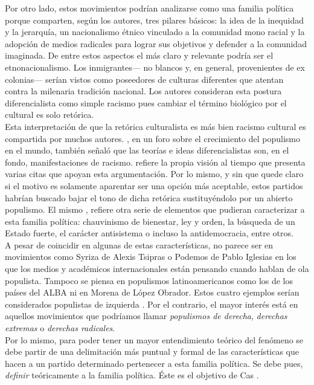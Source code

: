 Por otro lado, estos movimientos podrían analizarse como una familia política porque comparten, según los autores, tres pilares básicos: la idea de la inequidad y la jerarquía, un nacionalismo étnico vinculado a la comunidad mono racial y la adopción de medios radicales para lograr sus objetivos y defender a la comunidad imaginada. De entre estos aspectos el más claro y relevante podría ser el etnonacionalismo. Los inmigrantes--- no blancos y, en general, provenientes de ex colonias--- serían vistos como poseedores de culturas diferentes que atentan contra la milenaria tradición nacional. Los autores consideran esta postura diferencialista como simple racismo pues cambiar el término biológico por el cultural es solo retórica.\\

Esta interpretación de que la retórica culturalista es más bien racismo cultural es compartida por muchos autores. \textcite{Goodliffe17}, en un foro sobre el crecimiento del populismo en el mundo, también señaló que las teorías e ideas diferencialistas son, en el fondo, manifestaciones de racismo.  \textcite{Hainsworth16a} refiere la propia visión al tiempo que presenta varias citas que apoyan esta argumentación. Por lo mismo, y sin que quede claro si el motivo es solamente aparentar ser una opción más aceptable, estos partidos habrían buscado bajar el tono de dicha retórica sustituyéndolo por un abierto populismo. El mismo \textcite{Hainsworth16a}, refiere otra serie de elementos que pudieran caracterizar a esta familia política: chauvinismo de bienestar, ley y orden, la búsqueda de un Estado fuerte, el carácter antisistema o incluso la antidemocracia, entre otros.\\ 

A pesar de coincidir en algunas de estas características, no parece ser en movimientos como Syriza de Alexis Tsipras o Podemos de Pablo Iglesias en los que los medios y académicos internacionales están pensando cuando hablan de ola populista. Tampoco se piensa en populismos latinoamericanos como los de los países del ALBA ni en Morena de López Obrador. Estos cuatro ejemplos serían considerados populistas de izquierda \parencite{MuddeRovira17}. Por el contrario, el mayor interés está en aquellos movimientos que podríamos llamar \textit{populismos de derecha}, \textit{derechas extremas} o \textit{derechas radicales}.\\

Por lo mismo, para poder tener un mayor entendimiento teórico del fenómeno se debe partir de una delimitación más puntual y formal de las características que hacen a un partido determinado pertenecer a esta familia política. Se debe pues, \textit{definir} teóricamente a la familia política. Éste es el objetivo de Cas \textcite{Mudde07a}. 
\nopagebreak

